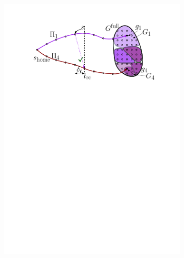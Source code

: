 \documentclass[conference]{IEEEtran}
\begin{document}
\begin{figure}[t]
\begin{subfigure}{0.225\textwidth}
        \includegraphics[width=\textwidth]{Latching_3}
        \caption{}
        \label{fig:pl3}
    \end{subfigure}
    \hspace{8mm}
    \begin{subfigure}{.225\textwidth}

\end{subfigure}
\end{figure}
\end{document}
